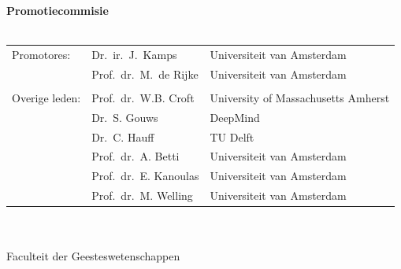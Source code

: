 {%
\clearpage
\noindent%
{\bf Promotiecommisie}\\
\\
\begin{tabular}[t]{@{}lll}
Promotores:      
& Dr.\ ir.\ J.~Kamps  & Universiteit van Amsterdam \\  
& Prof.\ dr.\ M.~de Rijke  & Universiteit van Amsterdam \\  

\\
Overige leden: 
& Prof.\ dr.\ W.B. Croft   &  University of Massachusetts Amherst \\ 
& Dr.\ S. Gouws  &  DeepMind \\ 
& Dr.\ C. Hauff   &   TU Delft \\ 
& Prof.\ dr.\ A. Betti    &  Universiteit van Amsterdam \\ 
& Prof.\ dr.\ E. Kanoulas    &  Universiteit van Amsterdam \\ 
& Prof.\ dr.\ M. Welling    &  Universiteit van Amsterdam \\ 
\end{tabular}\\
\\
Faculteit der Geesteswetenschappen \\ %
} %
\par\vspace {5cm}

